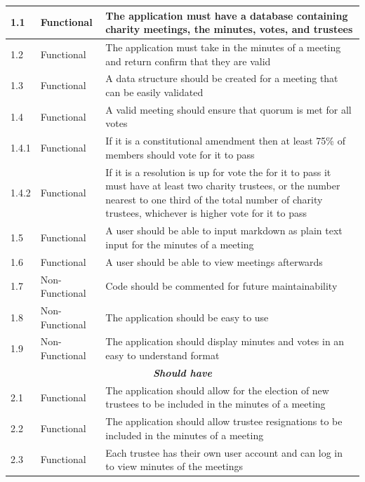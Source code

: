 \documentclass{UoYCSproject}
\begin{document}
\begin{table}[htb]
\begin{center}
{\begin{tabular}{|p{}|p{}|p{}|}
  1.1   &   Functional   & 
             The application must have a database containing charity meetings, the minutes, votes, and trustees   \\\hline
1.2   &   Functional   & 
             The application must take in the minutes of a meeting and return confirm that they are valid   \\\hline
1.3   &   Functional   & 
             A data structure should be created for a meeting that can be easily validated   \\\hline
1.4   &   Functional   & 
             A valid meeting should ensure that quorum is met for all votes   \\\hline
1.4.1   &   Functional   & 
             If it is a constitutional amendment then at least 75\% of members should vote for it to pass   \\\hline
1.4.2   &   Functional   & 
             If it is a resolution is up for vote the for it to pass it must have at least two charity trustees,
or the number nearest to one third of the total number of charity trustees, whichever is higher vote for it to pass   \\\hline
1.5   &   Functional   & 
             A user should be able to input markdown as plain text input for the minutes of a meeting   \\\hline
1.6   &   Functional   & 
             A user should be able to view meetings afterwards   \\\hline
1.7   &   Non-Functional   & 
             Code should be commented for future maintainability   \\\hline
1.8   &   Non-Functional   & 
             The application should be easy to use   \\\hline
1.9   &   Non-Functional   & 
             The application should display minutes and votes in an easy to understand format   \\\hline
 \multicolumn{3}{|c|}{\textit{\textbf{Should have}}} \\\hline
2.1   &   Functional   & 
             The application should allow for the election of new trustees to be included in the minutes of a meeting   \\\hline
2.2   &   Functional   & 
             The application should allow trustee resignations to be included in the minutes of a meeting   \\\hline
2.3   &   Functional   & 
             Each trustee has their own user account and can log in to view minutes of the meetings   \\\hline

\end{tabular}}
\end{center}
\end{table}
\end{document}
